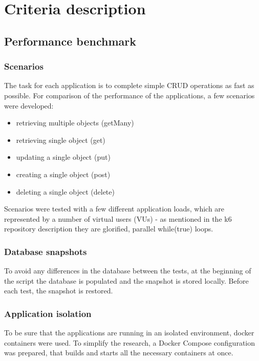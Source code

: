 \chapter{Criteria description}

\section{Performance benchmark}

\subsection{Scenarios}
The task for each application is to complete simple CRUD operations as fast as possible. For comparison of the performance of the applications, a few scenarios were developed:

\begin{itemize}
    \item retrieving multiple objects (getMany)
    \item retrieving single object (get)
    \item updating a single object (put)
    \item creating a single object (post)
    \item deleting a single object (delete)
\end{itemize}

Scenarios were tested with a few different application loads, which are represented by a number of virtual users (VUs) - as mentioned in the k6 repository description they are glorified, parallel while(true) loops. 


\subsection{Database snapshots}

To avoid any differences in the database between the tests, at the beginning of the script the database is populated and the snapshot is stored locally. Before each test, the snapshot is restored.


\subsection{Application isolation}

To be sure that the applications are running in an isolated environment, docker containers were used. To simplify the research, a Docker Compose configuration was prepared, that builds and starts all the necessary containers at once.

